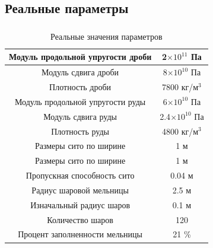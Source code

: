 \documentclass[c]{beamer}  %
\begin{document}
\subsection{Реальные параметры}

\begin{frame}
\frametitle{\insertsection} 
\framesubtitle{\insertsubsection}

\begin{table}[H]
\caption{Реальные значения параметров}
\begin{tabular}{|c|c|}
\hline
Модуль продольной упругости дроби & 2$\times 10^{11}$ Па  \\ 
\hline
Модуль сдвига дроби & 8$\times 10^{10}$ Па \\  
\hline
Плотность дроби & 7800 кг/м$^3$ \\
\hline
Модуль продольной упругости руды & 6$\times 10^{10}$ Па  \\ 
\hline
Модуль сдвига руды & 2.4$\times 10^{10}$ Па \\  
\hline
Плотность руды & 4800 кг/м$^3$ \\
\hline
Размеры сито по ширине & 1 м \\
\hline
Размеры сито по ширине & 1 м \\
\hline
Пропускная способность сито & 0.04 м \\
\hline
Радиус шаровой мельницы & 2.5 м \\
\hline
Изначальный радиус шаров & 0.1 м \\
\hline
Количество шаров & 120 \\
\hline
Процент заполненности мельницы & 21 \% \\
\hline
\end{tabular}
\end{table}
\end{frame}
\end{document}
